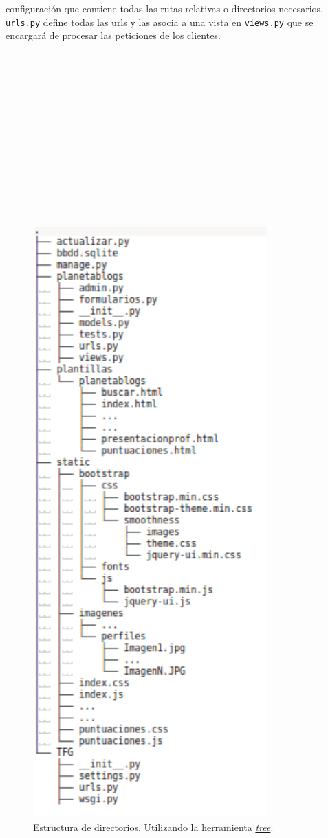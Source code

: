 \documentclass[a4paper, 12pt]{book}
\begin{document}
\begin{itemize}
  configuraci\'on que contiene todas las rutas relativas o directorios necesarios. \texttt{urls.py} define todas las urls y las asocia a una vista en
  \texttt{views.py} que se encargar\'a de procesar las peticiones de los clientes.\\\\\\\\\\\\\\\\\\\\\\\\\\\\
\end{itemize}


\begin{figure}
  \centering
  \includegraphics[width=9cm, keepaspectratio]{img/tree}
  \caption{Estructura de directorios. Utilizando la herramienta \href{http://www.computerhope.com/unix/tree.htm}{\textit{tree}}.}
  \label{fig:arquitectura}
\end{figure}
\end{document}
